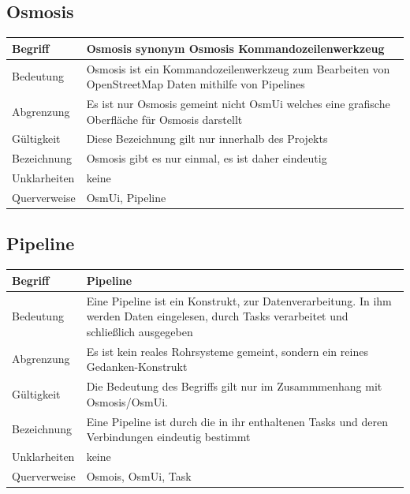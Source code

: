 \documentclass[a4paper,12pt]{scrartcl}
\begin{document}
\begin{center}
\subsection{Osmosis}
\begin{tabular}{|p{5cm}|p{10cm}|}
\hline Begriff & \textbf{Osmosis} synonym Osmosis Kommandozeilenwerkzeug\\ 
\hline Bedeutung & Osmosis ist ein Kommandozeilenwerkzeug zum Bearbeiten von OpenStreetMap Daten mithilfe von Pipelines \\ 
\hline Abgrenzung & Es ist nur Osmosis gemeint nicht OsmUi welches eine grafische Oberfläche für Osmosis darstellt\\ 
\hline Gültigkeit & Diese Bezeichnung gilt nur innerhalb des Projekts \\ 
\hline Bezeichnung & Osmosis gibt es nur einmal, es ist daher eindeutig \\ 
\hline Unklarheiten & keine \\ 
\hline Querverweise & OsmUi, Pipeline \\ 
\hline 
\end{tabular}
\subsection{Pipeline}
\begin{tabular}{|p{5cm}|p{10cm}|}
\hline Begriff & \textbf{Pipeline} \\ 
\hline Bedeutung & Eine Pipeline ist ein Konstrukt, zur Datenverarbeitung. In ihm werden Daten eingelesen, durch Tasks verarbeitet und schließlich ausgegeben\\ 
\hline Abgrenzung & Es ist kein reales Rohrsysteme gemeint, sondern ein reines Gedanken-Konstrukt \\ 
\hline Gültigkeit & Die Bedeutung des Begriffs gilt nur im Zusammmenhang mit Osmosis/OsmUi. \\ 
\hline Bezeichnung & Eine Pipeline ist durch die in ihr enthaltenen Tasks und deren Verbindungen eindeutig bestimmt \\ 
\hline Unklarheiten & keine \\ 
\hline Querverweise & Osmois, OsmUi, Task \\ 
\hline 
\end{tabular}

\end{center}
\end{document}
